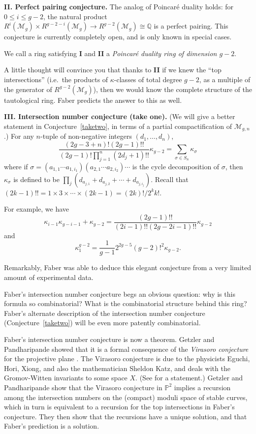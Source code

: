 \documentclass[12pt,letterpaper]{amsart}
\newcommand{\Q}{\mathbb{Q}}
\newcommand{\ka}{\kappa}
\newcommand{\proj}{\mathbb P}
\newcommand{\cm}{{\mathcal{M}}}
\newcommand{\si}{\sigma}
\newcommand{\lremind}[1]{{\bf[label:  #1]}}
\renewcommand{\lremind}[1]{{}}
\begin{document}
{\noindent
{\bf II.  Perfect pairing conjecture.}    
The analog of Poincar\'{e} duality holds: for $0 \leq i \leq g-2$, the natural
product $R^i(\cm_g) \times R^{g-2-i}(\cm_g) \rightarrow R^{g-2}(\cm_g)
\cong \Q$ is a perfect pairing.
This conjecture is currently completely open, and is only known in 
special cases.

We call a ring satisfying {\bf I} and {\bf II} a {\em Poincar\'e
duality ring of dimension $g-2$}.

A little thought will convince you that thanks to {\bf II} if we knew
the ``top intersections'' (i.e.\ the products of $\ka$-classes of
total degree $g-2$, as a multiple of the generator of
$R^{g-2}(\cm_g)$), then we would know the complete structure of the
tautological ring.    Faber predicts the answer to this as well.

\noindent
{\bf III. Intersection number conjecture (take one).}
(We will give a better statement in Conjecture~\ref{taketwo}, in terms
of a partial compactification of $\cm_{g,n}$.)\lremind{fconj1}
For any $n$-tuple of non-negative integers $(d_1, \dots, d_n)$,
\begin{equation}\label{fconj1}
\frac { (2g-3+n)! (2g-1)!!} { (2g-1)! \prod_{j=1}^n (2d_j+1)!!}
\ka_{g-2} = \sum_{\si \in S_n} \ka_{\si}\end{equation}
where 
if $\si=(a_{1,1} \cdots a_{1, i_1})(a_{2,1}
\cdots a_{2, i_2}) \cdots$ is the cycle decomposition of $\si$,
then $\ka_{\si}$ is defined to be $\prod_j (d_{a_{j,1}}+d_{a_{j,2}}+
\cdots + d_{a_{j,i_j}})$.
 Recall that $(2k-1)!! = 1 \times 3 \times \cdots \times (2k-1) = (2k)! / 2^k k!$.

For example, we have
$$\ka_{i-1} \ka_{g-i-1} + \ka_{g-2} = \frac { (2g-1)!!} { (2i-1)!! (2g-2i-1)!!} \ka_{g-2}$$
and
$$
\ka_1^{g-2} = \frac 1 {g-1} 2^{2g-5}  (g-2)!^2 \ka_{g-2}.$$

Remarkably, Faber was able to deduce this elegant conjecture from
a very limited amount of experimental data.

Faber's intersection number conjecture begs an obvious question: why
is this formula so combinatorial?  What is the combinatorial structure
behind this ring?  Faber's alternate description of the intersection
number conjecture (Conjecture~\ref{taketwo}) will be even more
patently combinatorial.

Faber's intersection number conjecture is now a theorem.  Getzler and
Pandharipande showed that it is a formal consequence of the {\em
  Virasoro conjecture} for the projective plane \cite{gp}.  The
Virasoro conjecture is due to the physicists Eguchi, Hori, Xiong, and
also the mathematician Sheldon Katz, and deals with the Gromov-Witten
invariants to some space $X$.  (See \cite[Sect.~ 10.1.4]{coxkatz} for a
statement.)  Getzler and Pandharipande show that the Virasoro
conjecture in $\proj^2$ implies a recursion among the intersection
numbers on the (compact) moduli space of stable curves, which in turn
is equivalent to a recursion for the top intersections in Faber's
conjecture.  They then show that the recursions have a unique
solution, and that Faber's prediction is a solution.

}
\end{document}
